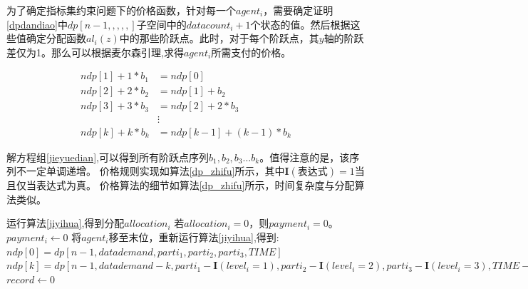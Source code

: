 \documentclass[promaster]{thesis-uestc}
\begin{document}
为了确定指标集约束问题下的价格函数，针对每一个$agent_i$，需要确定证明\ref{dpdandiao}中$dp[n-1,,,,,]$子空间中的$datacount_i+1$个状态的值。然后根据这些值确定分配函数$al_i(z)$中的那些阶跃点。此时，对于每个阶跃点，其$y$轴的阶跃差仅为1。那么可以根据麦尔森引理,求得$agent_i$所需支付的价格。

\begin{equation}
\label{jieyuedian}
 \begin{aligned}
 ndp[1]+1*b_1&=ndp[0]\\
 ndp[2]+2*b_2&=ndp[1]+b_2\\
 ndp[3]+3*b_3&=ndp[2]+2*b_3\\
 &\vdots\\
 ndp[k]+k*b_k&=ndp[k-1]+(k-1)*b_{k}
 \end{aligned}
\end{equation}

解方程组\ref{jieyuedian},可以得到所有阶跃点序列$b_1,b_2,b_3...b_k$。值得注意的是，该序列不一定单调递增。
价格规则实现如算法\ref{dp_zhifu}所示，其中$\mathbf{I}(\text{表达式}) = 1$当且仅当表达式为真。
价格算法的细节如算法\ref{dp_zhifu}所示，时间复杂度与分配算法类似。

\begin{algorithm}[h]
    运行算法\ref{jiyihua},得到分配$allocation_i$\;
    若$allocation_i=0$，则$payment_i=0$。\;
    {
        $payment_i \leftarrow 0$\;
        将$agent_i$移至末位，重新运行算法\ref{jiyihua},得到:\;
        $ndp[0] = dp[n-1,datademand,parti_1,parti_2,parti_3,TIME]$\;
        $ndp[k] = dp[n-1,datademand-k,parti_1-\mathbf{I}(level_i=1),parti_2-\mathbf{I}(level_i=2),parti_3-\mathbf{I}(level_i=3),TIME-k*timeperunit_i-transmitcost_i],1\leq k\leq datacount_i$\;
        $record \leftarrow 0$\;
    }\caption{指标集约束问题的价格算法}
\label{dp_zhifu}
\end{algorithm}

\end{document}
